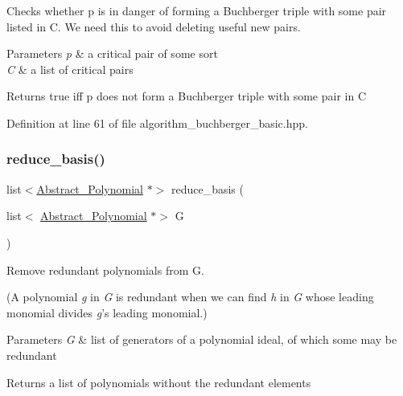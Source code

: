 Checks whether {\ttfamily p} is in danger of forming a Buchberger triple with some pair listed in {\ttfamily C}. We need this to avoid deleting useful new pairs. 


\begin{DoxyParams}{Parameters}
{\em p} & a critical pair of some sort \\
\hline
{\em C} & a list of critical pairs \\
\hline
\end{DoxyParams}
\begin{DoxyReturn}{Returns}
{\ttfamily true} iff {\ttfamily p} does not form a Buchberger triple with some pair in {\ttfamily C} 
\end{DoxyReturn}


Definition at line 61 of file algorithm\+\_\+buchberger\+\_\+basic.\+hpp.

\mbox{\label{group___g_b_computation_gaf4fe293e7cdc8ec2fd8b13df3318cb4a}} 
\subsubsection{\texorpdfstring{reduce\+\_\+basis()}{reduce\_basis()}}
{\footnotesize\ttfamily list$<$\hyperlink{group__polygroup_class_abstract___polynomial}{Abstract\+\_\+\+Polynomial} $\ast$$>$ reduce\+\_\+basis (\begin{DoxyParamCaption}\item[{list$<$ \hyperlink{group__polygroup_class_abstract___polynomial}{Abstract\+\_\+\+Polynomial} $\ast$$>$}]{G }\end{DoxyParamCaption})}



Remove redundant polynomials from {\ttfamily G}. 

(A polynomial {\itshape g} in {\itshape G} is redundant when we can find {\itshape h} in {\itshape G} whose leading monomial divides {\itshape g}'s leading monomial.) 
\begin{DoxyParams}{Parameters}
{\em G} & list of generators of a polynomial ideal, of which some may be redundant \\
\hline
\end{DoxyParams}
\begin{DoxyReturn}{Returns}
a list of polynomials without the redundant elements 
\end{DoxyReturn}


